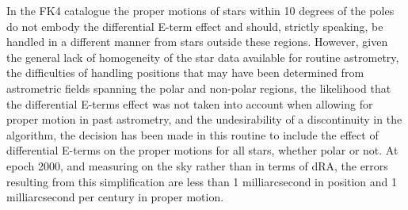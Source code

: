 \documentclass[twoside,11pt,nolof]{starlink}
\begin{document}
{{{         \sstitem
          In the FK4 catalogue the proper motions of stars within
         10 degrees of the poles do not embody the differential
         E-term effect and should, strictly speaking, be handled
         in a different manner from stars outside these regions.
         However, given the general lack of homogeneity of the star
         data available for routine astrometry, the difficulties of
         handling positions that may have been determined from
         astrometric fields spanning the polar and non-polar regions,
         the likelihood that the differential E-terms effect was not
         taken into account when allowing for proper motion in past
         astrometry, and the undesirability of a discontinuity in
         the algorithm, the decision has been made in this routine to
         include the effect of differential E-terms on the proper
         motions for all stars, whether polar or not.  At epoch 2000,
         and measuring on the sky rather than in terms of dRA, the
         errors resulting from this simplification are less than
         1 milliarcsecond in position and 1 milliarcsecond per
         century in proper motion.
      }
   }
}
\end{document}
